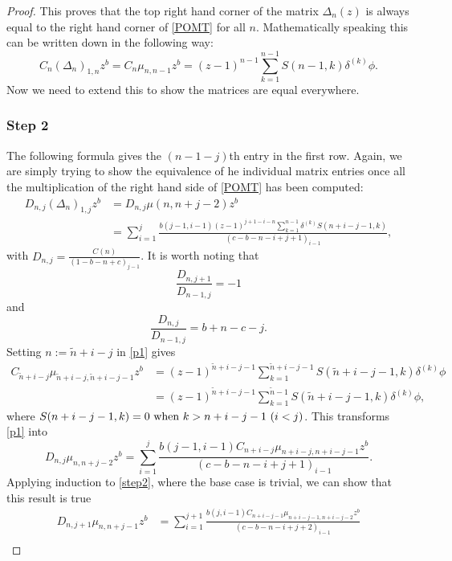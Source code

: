 \documentclass[12pt]{article}
\numberwithin{figure}{section}
\numberwithin{equation}{section}
\numberwithin{table}{section}
\begin{document}
\begin{proof}
This proves that the top right hand corner of the matrix $\Delta_n(z)$ is always equal to the right hand corner of \eqref{POMT} for all $n$.
Mathematically speaking this can be written down in the following way:
\begin{equation}
C_n(\Delta_n)_{1,n}z^b=C_n \mu_{n,n-1}z^b=(z-1)^{n-1}\sum^{n-1}_{k=1}S(n-1,k)\delta^{(k)}\phi. \label{p1}
\end{equation}
Now we need to extend this to show the matrices are equal everywhere.
\subsubsection{Step 2}
The following formula gives the $(n-1-j)$th entry in the first row. Again, we are simply trying to show the equivalence of he individual matrix entries once all the multiplication of the right hand side of \eqref{POMT} has been computed:
\begin{align*}
D_{n,j}(\Delta_n)_{1,j}z^b&=D_{n,j}\mu(n,n+j-2)z^b\\\
&=\sum^j_{i=1}\frac{b(j-1,i-1)(z-1)^{j+1-i-n}\sum^{n-1}_{k=1}\delta^{(k)}S(n+i-j-1,k)}{(c-b-n-i+j+1)_{i-1}},
\end{align*}
with $D_{n,j}={\frac {C \left( n \right) }{ \left( 1-b-n+c
 \right)_{j-1} }}$. It is worth noting that
 $$\frac{D_{n,j+1}}{D_{n-1,j}}=-1$$
 and
 \begin{equation}
 \frac{D_{n,j}}{D_{n-1,j}}=b+n-c-j.\label{ja}
 \end{equation}
Setting $n:=\widetilde n +i-j$ in \eqref{p1} gives
\begin{align*}
C_{\widetilde n +i-j}\mu_{\widetilde n +i-j,\widetilde n +i-j-1}z^b&=(z-1)^{\widetilde n +i-j-1}\sum^{\widetilde n +i-j-1}_{k=1}S(\widetilde n +i-j-1,k)\delta^{(k)}\phi\\
&=(z-1)^{\widetilde n +i-j-1}\sum^{\widetilde n-1}_{k=1}S(\widetilde n +i-j-1,k)\delta^{(k)}\phi,
\end{align*}
where $S(n+i-j-1,k)=0 ~{\rm{when}} ~k>n+i-j-1~(i<j)$.
This transforms \eqref{p1} into
\begin{equation}
D_{n,j}\mu_{n,n+j-2}z^b=\sum^j_{i=1}\frac{b(j-1,i-1)C_{ n +i-j}\mu_{ n +i-j, n +i-j-1}z^b}{(c-b-n-i+j+1)_{i-1}}.\label{step2}
\end{equation}
Applying induction to \eqref{step2}, where the base case is trivial, we can show that this result is true
\begin{align*}
D_{n,j+1}\mu_{n,n+j-1}z^b&=\sum^{j+1}_{i=1}\frac{b(j,i-1)C_{ n +i-j-1}\mu_{ n +i-j-1, n +i-j-2}z^b}{(c-b-n-i+j+2)_{i-1}}\\

\end{align*}
\end{proof}
\end{document}
